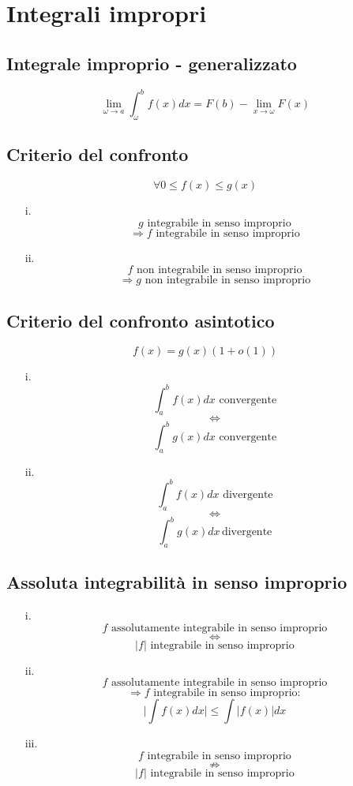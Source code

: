 \documentclass[a4paper,12pt]{report}
\theoremstyle{mystyle}
\begin{document}
\section{Integrali impropri}

\subsection{Integrale improprio - generalizzato}
\[\lim_{\omega \rightarrow a} \int_{\omega}^{b} f(x) dx = F(b) - \lim_{x \rightarrow \omega} F(x)\]

\subsection{Criterio del confronto}
\[\forall 0 \leq f(x) \leq g(x)\]

\begin{enumerate}
    \item[i.] \[g  \text{ integrabile in senso improprio}\]
        \[\Rightarrow f  \text{ integrabile in senso improprio}\]

        \item[ii.]\[f \text{ non integrabile in senso improprio}\]
        \[\Rightarrow g  \text{ non integrabile in senso improprio}\]
\end{enumerate}


\subsection{Criterio del confronto asintotico}
\[f(x) = g(x) (1+o(1))\]
\begin{enumerate}
    \item[i.] \[\int_a^b f(x) dx \text{ convergente}\]
        \[\Leftrightarrow\]
        \[\int_a^b g(x) dx  \text{ convergente}\]

    \item[ii.] \[\int_a^b f(x) dx  \text{ divergente} \]
        \[\Leftrightarrow\]
        \[\int_a^b g(x) dx \, \text{divergente}\]
\end{enumerate}


\subsection{Assoluta integrabilità in senso improprio}
\begin{enumerate}
    \item[i.] \[f  \text{ assolutamente integrabile in senso improprio}\]
        \[\Leftrightarrow \]
        \[\lvert f \rvert \text{ integrabile in senso improprio}\]

    \item[ii.] \[f  \text{ assolutamente integrabile in senso improprio} \]
        \[\Rightarrow f  \text{ integrabile in senso improprio} : \]
        \[\lvert \int f(x) dx \rvert \leq \int \lvert f (x) \rvert dx\]

    \item[iii.] \[f  \text{ integrabile in senso improprio} \]
        \[\nRightarrow\]
        \[\lvert f \rvert  \text{ integrabile in senso improprio}\]
\end{enumerate}
\end{document}
